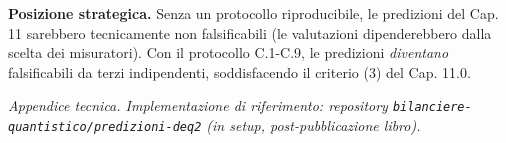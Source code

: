 \Hypoth{} \textbf{Posizione strategica.} Senza un protocollo
riproducibile, le predizioni del Cap. 11 sarebbero tecnicamente non
falsificabili (le valutazioni dipenderebbero dalla scelta dei
misuratori). Con il protocollo C.1-C.9, le predizioni \emph{diventano}
falsificabili da terzi indipendenti, soddisfacendo il criterio (3) del
Cap. 11.0.



\emph{Appendice tecnica. Implementazione di riferimento: repository
\texttt{bilanciere-quantistico/predizioni-deq2} (in setup,
post-pubblicazione libro).}
